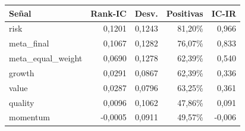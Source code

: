 \begin{tabular}{lrrrr}
\toprule
Señal & Rank-IC & Desv. & Positivas & IC-IR \\
\midrule
risk & 0,1201 & 0,1243 & 81,20\% & 0,966 \\
meta\_final & 0,1067 & 0,1282 & 76,07\% & 0,833 \\
meta\_equal\_weight & 0,0690 & 0,1278 & 62,39\% & 0,540 \\
growth & 0,0291 & 0,0867 & 62,39\% & 0,336 \\
value & 0,0287 & 0,0796 & 63,25\% & 0,361 \\
quality & 0,0096 & 0,1062 & 47,86\% & 0,091 \\
momentum & -0,0005 & 0,0911 & 49,57\% & -0,006 \\
\bottomrule
\end{tabular}
